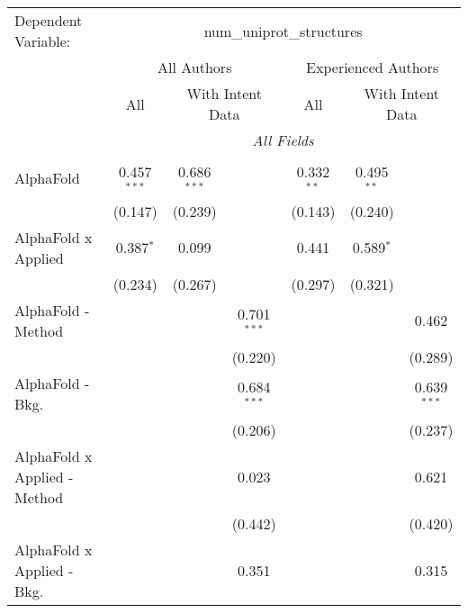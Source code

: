 \begingroup
\centering
\begin{tabular}{lcccccc}
   \tabularnewline \midrule \midrule
   Dependent Variable: & \multicolumn{6}{c}{num\_uniprot\_structures}\\
 & \multicolumn{3}{c}{All Authors} & \multicolumn{3}{c}{Experienced Authors} \\
\cmidrule(lr){2-4} \cmidrule(lr){5-7}
 & \multicolumn{1}{c}{All} & \multicolumn{2}{c}{With Intent Data} & \multicolumn{1}{c}{All} & \multicolumn{2}{c}{With Intent Data} \\
\cmidrule(lr){2-2} \cmidrule(lr){3-4} \cmidrule(lr){5-5} \cmidrule(lr){6-7}
 & \multicolumn{6}{c}{\textit{All Fields}} \\ \\
   AlphaFold                      & 0.457$^{***}$ & 0.686$^{***}$ &                & 0.332$^{**}$  & 0.495$^{**}$  &   \\   
                                  & (0.147)       & (0.239)       &                & (0.143)       & (0.240)       &   \\   
   AlphaFold x Applied            & 0.387$^{*}$   & 0.099         &                & 0.441         & 0.589$^{*}$   &   \\   
                                  & (0.234)       & (0.267)       &                & (0.297)       & (0.321)       &   \\   
   AlphaFold - Method             &               &               & 0.701$^{***}$  &               &               & 0.462\\   
                                  &               &               & (0.220)        &               &               & (0.289)\\   
   AlphaFold - Bkg.               &               &               & 0.684$^{***}$  &               &               & 0.639$^{***}$\\   
                                  &               &               & (0.206)        &               &               & (0.237)\\   
   AlphaFold x Applied - Method   &               &               & 0.023          &               &               & 0.621\\   
                                  &               &               & (0.442)        &               &               & (0.420)\\   
   AlphaFold x Applied - Bkg.     &               &               & 0.351          &               &               & 0.315\\   

\end{tabular}
